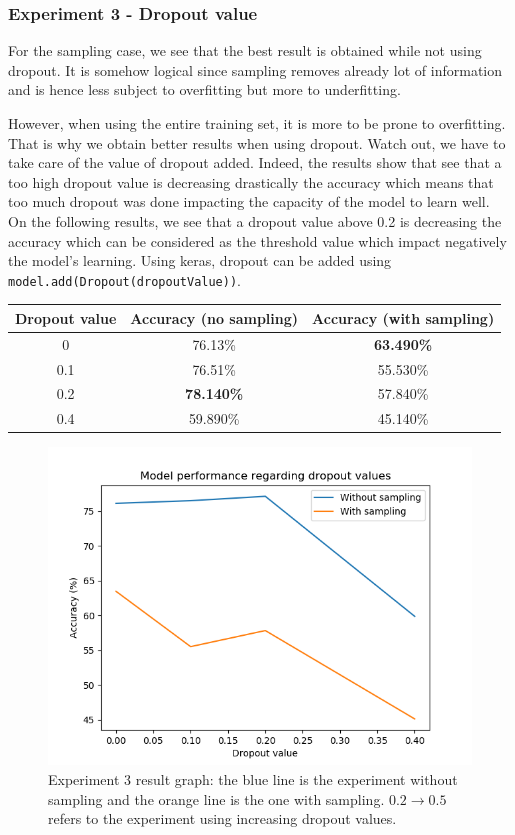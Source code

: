 \documentclass[11pt, openany]{report}
\theoremstyle{plain}
\theoremstyle{definition}
\theoremstyle{remark}
\begin{document}
\subsubsection{Experiment 3 - Dropout value} 

For the sampling case, we see that the best result is obtained while not using dropout. It is somehow logical since sampling removes already lot of information and is hence less subject to overfitting but more to underfitting. 

However, when using the entire training set, it is more to be prone to overfitting. That is why we obtain better results when using dropout. Watch out, we have to take care of the value of dropout added. Indeed, the results show that see that a too high dropout value is decreasing drastically the accuracy which means that too much dropout was done impacting the capacity of the model to learn well. On the following results, we see that a dropout value above 0.2 is decreasing the accuracy which can be considered as the threshold value which impact negatively the model's learning. Using keras, dropout can be added using \texttt{model.add(Dropout(dropoutValue))}. 

\begin{center}
\begin{tabular}{|c|c|c|}
  \hline
  Dropout value & Accuracy (no sampling) & Accuracy (with sampling) \\
  \hline
  0 & 76.13\% &  \textbf{63.490\%} \\
  0.1 & 76.51\% & 55.530\% \\
  0.2 & \textbf{78.140\%} & 57.840\% \\
  0.4 & 59.890\% & 45.140\% \\
  \hline
\end{tabular}
\end{center}


\begin{figure}[H]
  \centering
  \includegraphics[scale=0.6]{Code/figures_result/dropout_graph.png}
  \caption{Experiment 3 result graph: the blue line is the experiment without sampling and the orange line is the one with sampling. $0.2 \rightarrow 0.5$ refers to the experiment using increasing dropout values.}
  \label{fig:cifar_dropout_res}
\end{figure}
\end{document}
